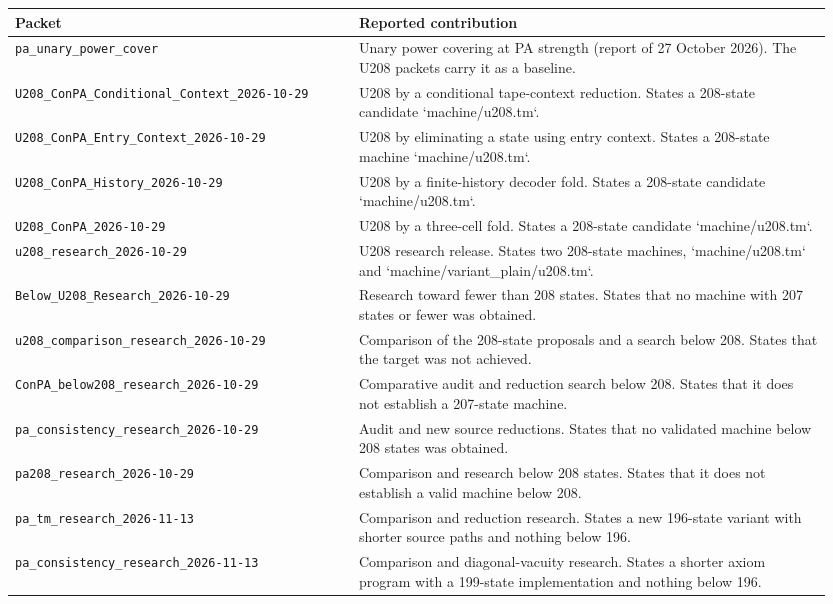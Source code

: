 \begin{longtable}{@{}p{0.40\linewidth}p{0.55\linewidth}@{}}
\toprule Packet & Reported contribution\\\midrule\endhead
\nolinkurl{pa_unary_power_cover} & Unary power covering at PA strength (report of 27 October 2026). The U208 packets carry it as a baseline.\\[4pt]
\nolinkurl{U208_ConPA_Conditional_Context_2026-10-29} & U208 by a conditional tape-context reduction. States a 208-state candidate `machine/u208.tm`.\\[4pt]
\nolinkurl{U208_ConPA_Entry_Context_2026-10-29} & U208 by eliminating a state using entry context. States a 208-state machine `machine/u208.tm`.\\[4pt]
\nolinkurl{U208_ConPA_History_2026-10-29} & U208 by a finite-history decoder fold. States a 208-state candidate `machine/u208.tm`.\\[4pt]
\nolinkurl{U208_ConPA_2026-10-29} & U208 by a three-cell fold. States a 208-state candidate `machine/u208.tm`.\\[4pt]
\nolinkurl{u208_research_2026-10-29} & U208 research release. States two 208-state machines, `machine/u208.tm` and `machine/variant\_plain/u208.tm`.\\[4pt]
\nolinkurl{Below_U208_Research_2026-10-29} & Research toward fewer than 208 states. States that no machine with 207 states or fewer was obtained.\\[4pt]
\nolinkurl{u208_comparison_research_2026-10-29} & Comparison of the 208-state proposals and a search below 208. States that the target was not achieved.\\[4pt]
\nolinkurl{ConPA_below208_research_2026-10-29} & Comparative audit and reduction search below 208. States that it does not establish a 207-state machine.\\[4pt]
\nolinkurl{pa_consistency_research_2026-10-29} & Audit and new source reductions. States that no validated machine below 208 states was obtained.\\[4pt]
\nolinkurl{pa208_research_2026-10-29} & Comparison and research below 208 states. States that it does not establish a valid machine below 208.\\[4pt]
\nolinkurl{pa_tm_research_2026-11-13} & Comparison and reduction research. States a new 196-state variant with shorter source paths and nothing below 196.\\[4pt]
\nolinkurl{pa_consistency_research_2026-11-13} & Comparison and diagonal-vacuity research. States a shorter axiom program with a 199-state implementation and nothing below 196.\\[4pt]

\end{longtable}
